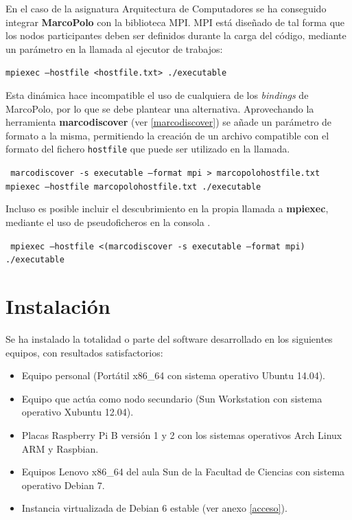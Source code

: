 En el caso de la asignatura Arquitectura de Computadores se ha conseguido integrar \textbf{MarcoPolo} con la biblioteca MPI. MPI está diseñado de tal forma que los nodos participantes deben ser definidos durante la carga del código, mediante un parámetro en la llamada al ejecutor de trabajos:

\texttt{mpiexec --hostfile <hostfile.txt> ./executable}

Esta dinámica hace incompatible el uso de cualquiera de los \textit{bindings} de MarcoPolo, por lo que se debe plantear una alternativa. Aprovechando la herramienta \textbf{marcodiscover} (ver \ref{marcodiscover}) se añade un parámetro de formato a la misma, permitiendo la creación de un archivo compatible con el formato del fichero \texttt{hostfile} que puede ser utilizado en la llamada.

\texttt{
marcodiscover -s executable --format mpi > marcopolohostfile.txt
mpiexec --hostfile marcopolohostfile.txt ./executable
}

Incluso es posible incluir el descubrimiento en la propia llamada a \textbf{mpiexec}, mediante el uso de pseudoficheros en la consola \cite{pseudofile}.

\texttt{
	mpiexec --hostfile <(marcodiscover -s executable --format mpi) ./executable
}

\section{Instalación}

Se ha instalado la totalidad o parte del software desarrollado en los siguientes equipos, con resultados satisfactorios:

\begin{itemize}
	\item Equipo personal (Portátil x86\_64 con sistema operativo Ubuntu 14.04).
	\item Equipo que actúa como nodo secundario (Sun Workstation con sistema operativo Xubuntu 12.04).
	\item Placas Raspberry Pi B versión 1 y 2 con los sistemas operativos Arch Linux ARM y Raspbian.
	\item Equipos Lenovo x86\_64 del aula Sun de la Facultad de Ciencias con sistema operativo Debian 7.
	\item Instancia virtualizada de Debian 6 estable (ver anexo \ref{acceso}).
\end{itemize}